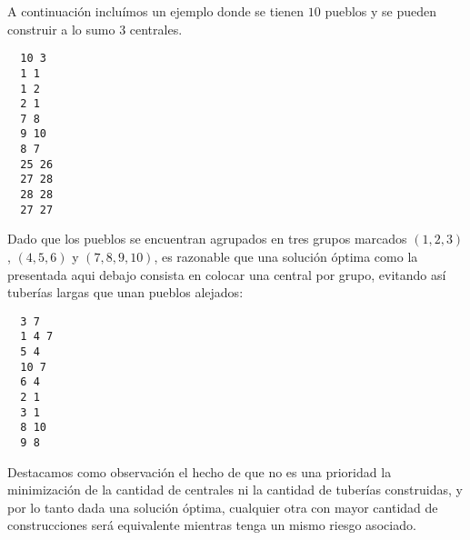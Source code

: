 A continuación incluímos un ejemplo donde se tienen $10$ pueblos y se pueden construir a lo sumo $3$ centrales.
\begin{verbatim}
  10 3
  1 1
  1 2
  2 1
  7 8
  9 10
  8 7
  25 26
  27 28
  28 28
  27 27
\end{verbatim}

Dado que los pueblos se encuentran agrupados en tres grupos marcados $(1, 2, 3)$, $(4, 5, 6)$ y $(7, 8, 9, 10)$, es razonable que una solución óptima como la presentada aqui debajo consista en colocar una central por grupo, evitando así tuberías largas que unan pueblos alejados:

\begin{verbatim}
  3 7
  1 4 7 
  5 4
  10 7
  6 4
  2 1
  3 1
  8 10
  9 8
\end{verbatim}

Destacamos como observación el hecho de que no es una prioridad la minimización de la cantidad de centrales ni la cantidad de tuberías construidas, y por lo tanto dada una solución óptima, cualquier otra con mayor cantidad de construcciones será equivalente mientras tenga un mismo riesgo asociado.